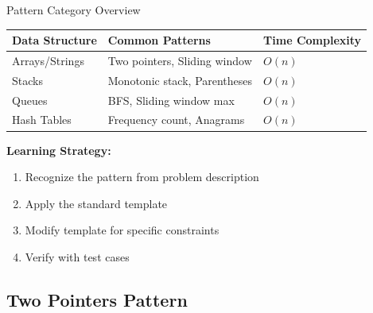 \documentclass[aspectratio=169,xcolor=dvipsnames]{beamer}
\begin{document}
\begin{frame}{Pattern Category Overview}
  \begin{table}
    \centering
    \small
    \begin{tabular}{lll}
      \hline
      \textbf{Data Structure} & \textbf{Common Patterns} & \textbf{Time Complexity} \\
      \hline
      Arrays/Strings & Two pointers, Sliding window & $O(n)$ \\
      Stacks & Monotonic stack, Parentheses & $O(n)$ \\
      Queues & BFS, Sliding window max & $O(n)$ \\
      Hash Tables & Frequency count, Anagrams & $O(n)$ \\
      \hline
    \end{tabular}
  \end{table}

  \vspace{0.3cm}
  \textbf{Learning Strategy:}
  \begin{enumerate}
    \item Recognize the pattern from problem description
    \item Apply the standard template
    \item Modify template for specific constraints
    \item Verify with test cases
  \end{enumerate}
\end{frame}

\subsection{Two Pointers Pattern}
\end{document}
